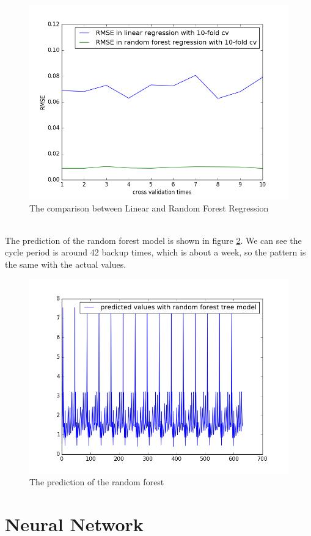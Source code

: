 \documentclass{article}
\begin{document}
\begin{figure}[htbp]
\centering
\includegraphics[width=.6\textwidth]{compare.png}
\caption{The comparison between Linear and Random Forest Regression}
\label{fig:comp}
\end{figure}
\\
The prediction of the random forest model is shown in figure \ref{fig:r_pred}. We can see the cycle period is around 42 backup times, which is about a week, so the pattern is the same with the actual values.
\begin{figure}[htbp]
\centering
\includegraphics[width=.6\textwidth]{random_pred.png}
\caption{The prediction of the random forest}
\label{fig:r_pred}
\end{figure}
\section{Neural Network}
\end{document}
